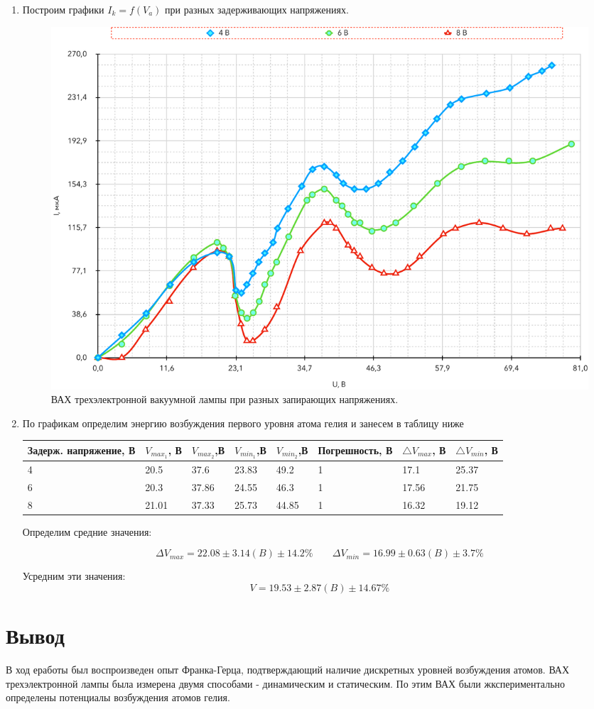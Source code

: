\documentclass[a4paper]{article}
\begin{document}
\begin{enumerate}
\item Построим графики $I_k = f(V_a)$ при разных задерживающих напряжениях.

\begin{figure}[H]
	\begin{center}
	\includegraphics[scale = 0.6]{graph.pdf}
	\caption{ВАХ трехэлектронной вакуумной лампы при разных запирающих напряжениях.}
	\label{graph}
	\end{center}
\end{figure}

\item 
По графикам определим энергию возбуждения первого уровня атома гелия и занесем в таблицу ниже

\begin{table}[H]
    \centering
    \begin{center}
    \end{center}
    \vspace{0.1cm}
    \begin{tabular}{ |p{3.5cm}||p{1.5cm}|p{1.5cm}|p{1.5cm}|p{1.5cm}|p{2.5cm}|p{1.5cm}|p{1.5cm}|}
 \hline
Задерж. напряжение, В & $V_{max_1}$, В & $V_{max_2}$,В & $V_{min_1}$,В & $V_{min_2}$,В & Погрешность, В & $\triangle V_{max}$, В & $\triangle V_{min}$, В\\
 \hline
 4  & 20.5  & 37.6  & 23.83  & 49.2  & 1  & 17.1  & 25.37 \\
\hline
 6  & 20.3  & 37.86 & 24.55  & 46.3  & 1  & 17.56  & 21.75 \\
\hline
 8  & 21.01  & 37.33 & 25.73  & 44.85  & 1  & 16.32  & 19.12 \\
\hline

\end{tabular}
\end{table}

Определим средние значения:

$$\Delta V_{max} = 22.08 \pm 3.14 (B) \pm 14.2\% \;\;\;\;\;\;\; \Delta V_{min} = 16.99 \pm 0.63 (B) \pm 3.7\%$$

Усредним эти значения:
$$V = 19.53 \pm 2.87 (B) \pm 14.67\%$$

\end{enumerate}

\section{Вывод}

В ход еработы был воспроизведен опыт Франка-Герца, подтверждающий наличие дискретных уровней 
возбуждения атомов. ВАХ трехэлектронной лампы была измерена двумя способами - динамическим и 
статическим. По этим ВАХ были жкспериментально определены потенциалы возбуждения атомов гелия.
\end{document}
